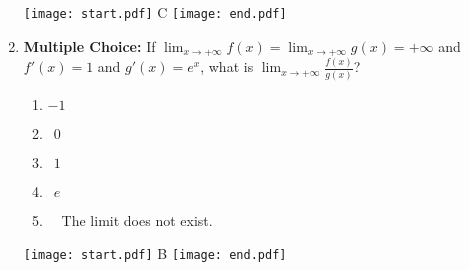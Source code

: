 \documentclass[12pt]{article}
\begin{document}
\begin{enumerate}
\begin{enumerate}
\end{enumerate}

\texttt{[image: start.pdf]}
{{C}}
\texttt{[image: end.pdf]}


\item {\bf Multiple Choice:} If $\displaystyle \lim_{x\rightarrow +\infty} f(x) =
\lim_{x\rightarrow +\infty} g(x) = +\infty$ and $f'(x)=1$ and $g'(x)=e^x$, what is 
$\displaystyle \lim_{x\rightarrow +\infty}\frac{f(x)}{g(x)}$?

\begin{enumerate}

\item $-1$

\item $\ \ 0$

\item $\ \ 1$

\item $\ \ e$

\item \ \ The limit does not exist.

\end{enumerate}

\texttt{[image: start.pdf]}
{{B}}
\texttt{[image: end.pdf]}


\end{enumerate}
\end{document}
